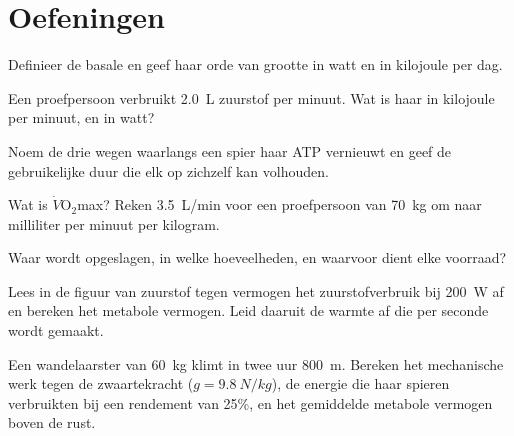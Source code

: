 \section{Oefeningen}

\begin{exercise}[$\star$]\label{exo:g10:exercise-and-energy:1}
Definieer de basale  en geef haar orde van grootte in watt
en in kilojoule per dag.
\end{exercise}

\begin{exercise}[$\star$]\label{exo:g10:exercise-and-energy:2}
Een proefpersoon verbruikt \qty{2.0}{L} zuurstof per minuut. Wat is haar
 in kilojoule per minuut, en in watt?
\end{exercise}

\begin{exercise}[$\star$]\label{exo:g10:exercise-and-energy:3}
Noem de drie wegen waarlangs een spier haar ATP vernieuwt en geef de
gebruikelijke duur die elk op zichzelf kan volhouden.
\end{exercise}

\begin{exercise}[$\star$]\label{exo:g10:exercise-and-energy:4}
Wat is $\dot V\!\mathrm{O_2}$max? Reken \qty{3.5}{L/min} voor een
proefpersoon van \qty{70}{kg} om naar milliliter per minuut per kilogram.
\end{exercise}

\begin{exercise}[$\star$]\label{exo:g10:exercise-and-energy:5}
Waar wordt  opgeslagen, in welke hoeveelheden, en waarvoor
dient elke voorraad?
\end{exercise}

\begin{exercise}[$\star\star$]\label{exo:g10:exercise-and-energy:6}
Lees in de figuur van zuurstof tegen vermogen het zuurstofverbruik bij
\qty{200}{W} af en bereken het metabole vermogen. Leid daaruit de warmte
af die per seconde wordt gemaakt.
\end{exercise}

\begin{exercise}[$\star\star$]\label{exo:g10:exercise-and-energy:7}
Een wandelaarster van \qty{60}{kg} klimt in twee uur \qty{800}{m}.
Bereken het mechanische werk tegen de zwaartekracht
($g = \qty{9.8}{N/kg}$), de energie die haar spieren verbruikten bij een
rendement van 25\%, en het gemiddelde metabole vermogen boven de rust.
\end{exercise}

